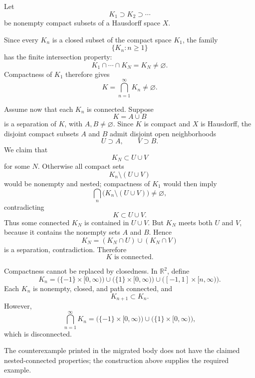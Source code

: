 \begin{solution}
Let
\[
K_1\supset K_2\supset\cdots
\]
be nonempty compact subsets of a Hausdorff space \(X\).

Since every \(K_n\) is a closed subset of the compact space \(K_1\), the family
\[
\{K_n:n\ge1\}
\]
has the finite intersection property:
\[
K_1\cap\cdots\cap K_N=K_N\neq\varnothing.
\]
Compactness of \(K_1\) therefore gives
\[
\boxed{
K=\bigcap_{n=1}^{\infty}K_n\neq\varnothing.
}
\]

Assume now that each \(K_n\) is connected. Suppose
\[
K=A\cup B
\]
is a separation of \(K\), with \(A,B\neq\varnothing\). Since \(K\) is compact and \(X\) is Hausdorff, the disjoint compact subsets \(A\) and \(B\) admit disjoint open neighborhoods
\[
U\supset A,
\qquad
V\supset B.
\]
We claim that
\[
K_N\subset U\cup V
\]
for some \(N\). Otherwise all compact sets
\[
K_n\setminus(U\cup V)
\]
would be nonempty and nested; compactness of \(K_1\) would then imply
\[
\bigcap_n
\bigl(K_n\setminus(U\cup V)\bigr)
\neq\varnothing,
\]
contradicting
\[
K\subset U\cup V.
\]
Thus some connected \(K_N\) is contained in \(U\cup V\). But \(K_N\) meets both \(U\) and \(V\), because it contains the nonempty sets \(A\) and \(B\). Hence
\[
K_N=(K_N\cap U)\cup(K_N\cap V)
\]
is a separation, contradiction. Therefore
\[
\boxed{K\text{ is connected}.}
\]

Compactness cannot be replaced by closedness. In \(\mathbb R^2\), define
\[
K_n
=
\bigl(\{-1\}\times[0,\infty)\bigr)
\cup
\bigl(\{1\}\times[0,\infty)\bigr)
\cup
\bigl([-1,1]\times[n,\infty)\bigr).
\]
Each \(K_n\) is nonempty, closed, and path connected, and
\[
K_{n+1}\subset K_n.
\]
However,
\[
\bigcap_{n=1}^{\infty}K_n
=
\bigl(\{-1\}\times[0,\infty)\bigr)
\cup
\bigl(\{1\}\times[0,\infty)\bigr),
\]
which is disconnected.

The counterexample printed in the migrated body does not have the claimed nested-connected properties; the construction above supplies the required example.
\end{solution}


